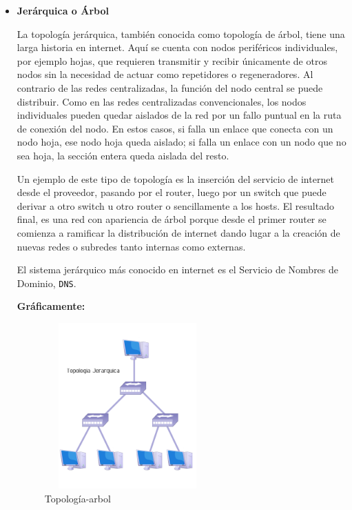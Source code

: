 \begin{itemize}
 \item \textbf{Jerárquica o Árbol}

La topología jerárquica, también conocida como topología de árbol, tiene una larga historia en internet. Aquí  se cuenta con nodos periféricos individuales, por ejemplo hojas, que requieren transmitir  y recibir  únicamente de otros nodos sin la necesidad de actuar como repetidores o regeneradores. Al contrario de las redes centralizadas, la función del nodo central se puede distribuir. Como en las redes centralizadas convencionales, los nodos individuales pueden quedar aislados de la red por un fallo puntual en la ruta de conexión del nodo.
En estos casos, si falla un enlace que conecta con un nodo hoja, ese nodo hoja queda aislado; si falla un enlace con un nodo que no sea hoja, la sección entera queda aislada del resto.

Un ejemplo de este tipo de topología es la inserción del servicio de internet desde el proveedor, pasando por el router, luego por un switch que puede derivar a otro switch u otro router o sencillamente a los hosts. El resultado final, es una red con apariencia de árbol porque desde el primer router se comienza a ramificar la distribución de internet dando lugar a la creación de nuevas redes o subredes tanto internas como externas.

El sistema jerárquico más conocido en internet es el Servicio de Nombres de Dominio, \texttt{DNS}.\\
\newpage

\textbf{Gráficamente: }

\begin{figure}[H]
\begin{center}
  \includegraphics[height=2.5in,width=2.5in]{images/arbol.png}
\caption{Topología-arbol }
\label{fig:Arbol}
\end{center}
\end{figure} 


\end{itemize}

